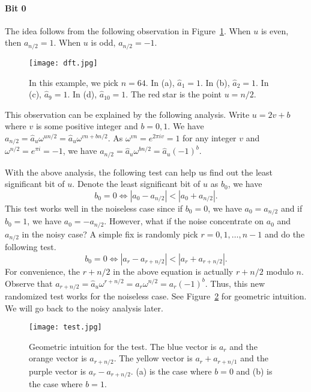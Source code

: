 \documentclass[11pt]{article}
\begin{document}
\paragraph{Bit 0}
The idea follows from the following observation in Figure~\ref{fig:dft}. When $u$ is even, then $a_{n/2}=1$. When $u$ is odd, $a_{n/2}=-1$.

\begin{figure}[h]
	\centering
	\texttt{[image: dft.jpg]}
	\caption{In this example, we pick $n=64$. In (a), $\hat{a}_1=1$. In (b), $\hat{a}_2=1$. In (c), $\hat{a}_9=1$. In (d), $\hat{a}_{10}=1$. The red star is the point $u=n/2$.}
	\label{fig:dft}
\end{figure}

This observation can be explained by the following analysis. Write $u=2v+b$ where $v$ is some positive integer and $b=0,1$. We have $a_{n/2}=\hat{a}_u\omega^{un/2}=\hat{a}_u\omega^{vn+bn/2}$. As $\omega^{vn}=e^{2\pi iv}=1$ for any integer $v$ and $\omega^{n/2}=e^{\pi i}=-1$, we have $a_{n/2}=\hat{a}_u\omega^{bn/2}=\hat{a}_u(-1)^b$.

With the above analysis, the following test can help us find out the least significant bit of $u$. Denote the least significant bit of $u$ as $b_0$, we have
\begin{equation*}
b_0=0\Leftrightarrow|a_0-a_{n/2}|<|a_0+a_{n/2}|.
\end{equation*}
This test works well in the noiseless case since if $b_0=0$, we have $a_0=a_{n/2}$ and if $b_0=1$, we have $a_0=-a_{n/2}$. However, what if the noise concentrate on $a_0$ and $a_{n/2}$ in the noisy case? A simple fix is randomly pick $r=0,1,\dots,n-1$ and do the following test.
\begin{equation*}
b_0=0\Leftrightarrow|a_r-a_{r+n/2}|<|a_r+a_{r+n/2}|.
\end{equation*}
For convenience, the $r+n/2$ in the above equation is actually $r+n/2$ modulo $n$.
Observe that $a_{r+n/2} = \hat{a}_u\omega^{r+n/2}=a_r\omega^{n/2}=a_r(-1)^b$. Thus, this new randomized test works for the noiseless case. See Figure~\ref{fig:test} for geometric intuition. We will go back to the noisy analysis later.

\begin{figure}[h]
	\centering
	\texttt{[image: test.jpg]}
	\caption{Geometric intuition for the test. The blue vector is $a_r$ and the orange vector is $a_{r+n/2}$. The yellow vector is $a_r+a_{r+n/1}$ and the purple vector is $a_{r}-a_{r+n/2}$. (a) is the case where $b=0$ and (b) is the case where $b=1$.}
	\label{fig:test}
\end{figure}
\end{document}
